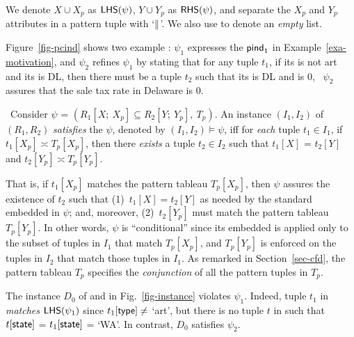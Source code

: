  We denote $X \cup X_p$ as ${\mathsf{LHS}}(\psi)$, $Y \cup Y_p$ as ${\mathsf{RHS}}(\psi)$, and
separate the $X_p$ and $Y_p$ attributes in a pattern tuple with
`$\parallel$'. We also use  to denote an {\em empty} list. 



\vspace{-0.5ex}
\begin{example}
\label{exam-pcind} Figure~\ref{fig-pcind} shows two example \pCINDs:
$\psi_1$ expresses the ${\mathsf{pind}}_1$ in Example~\ref{exa-motivation},
and $\psi_2$ refines $\psi_1$ by stating that for any 
tuple $t_1$, if its  is not art and its  is DL,
then there must be a  tuple $t_2$ such that its 
is DL and  is $0$, \ie~$\psi_2$ assures that the sale tax
rate in Delaware is 0.
\end{example}
\vspace{-1ex}






~Consider \pCIND $\psi$ =
$(R_1[X;\ X_p] \subseteq R_2[Y;\ Y_p],\ T_p)$.
An instance  $(I_1, I_2)$ of $(R_1, R_2)$ {\em satisfies} the \pCIND
$\psi$, denoted by $(I_1, I_2) \models \psi$, iff for {\em each}
tuple $t_1\in I_1$, if $t_1[X_p] \asymp T_p[X_p]$, then there {\em
exists} a tuple $t_2\in I_2$ such that $t_1[X]$ = $t_2[Y]$ and $t_2[Y_p] \asymp T_p[Y_p]$.


That is, if $t_1[X_p]$ matches
the pattern tableau $T_p[X_p]$, then $\psi$ assures the
existence of $t_2$ such that (1)~$t_1[X] = t_2[Y]$ as
needed by the standard \IND embedded in $\psi$;
and, moreover, (2)~$t_2[Y_p]$
must match the pattern tableau $T_p[Y_p]$. In other words,
$\psi$ is ``conditional'' since its embedded \IND is applied only to the
subset of tuples in $I_1$ that match $T_p[X_p]$, and
$T_p[Y_p]$ is enforced on the tuples in $I_2$
that match those tuples in $I_1$. As remarked in Section~\ref{sec-cfd},
the pattern tableau $T_p$ specifies the {\em conjunction} of
all the pattern tuples in $T_p$.

\vspace{-0.5ex}
\begin{example}
The instance $D_0$ of  and  in
Fig.~\ref{fig-instance} violates \pCIND $\psi_1$. Indeed, tuple
$t_1$ in  {\em matches} ${\mathsf{LHS}}(\psi_1)$ since
$t_1[\protect\mathsf{type}] \ne $ `art', but there is no tuple $t$ in 
such that $t[\protect\mathsf{state}]$ = $t_1[\protect\mathsf{state}]$ = `WA'. In contrast,
$D_0$ satisfies $\psi_2$.
\end{example}


